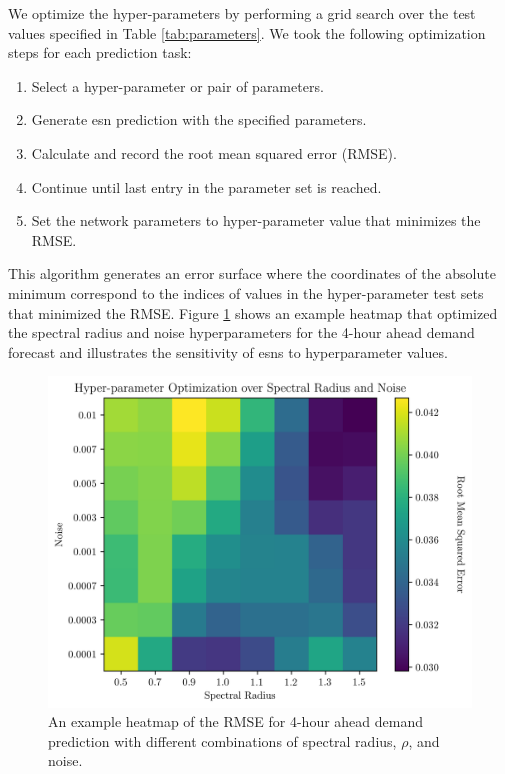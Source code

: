  We optimize the hyper-parameters by performing a grid search over the test
 values specified in Table \ref{tab:parameters}. We took the following
 optimization steps for each prediction task:
 \begin{enumerate}
   \item Select a hyper-parameter or pair of parameters.
   \item Generate \gls{esn} prediction with the specified parameters.
   \item Calculate and record the root mean squared error (RMSE).
   \item Continue until last entry in the parameter set is reached.
   \item Set the network parameters to hyper-parameter value that minimizes the
   RMSE.
 \end{enumerate}
 This algorithm generates an error surface where the coordinates of the absolute
 minimum correspond to the indices of values in the hyper-parameter test sets
 that minimized the RMSE. Figure \ref{fig:rhoxnoise-demand04} shows an example
 heatmap that optimized the spectral radius and noise hyperparameters for the 4-hour
 ahead demand forecast and illustrates the sensitivity of \glspl{esn} to
 hyperparameter values.

 \begin{figure}[h]
   \includegraphics[width=\columnwidth]{./images/04_demand_rho_noise_loss.png}
   \caption{An example heatmap of the RMSE for 4-hour ahead demand prediction with different combinations of spectral radius, $\rho$, and noise.}
   \label{fig:rhoxnoise-demand04}
 \end{figure}

